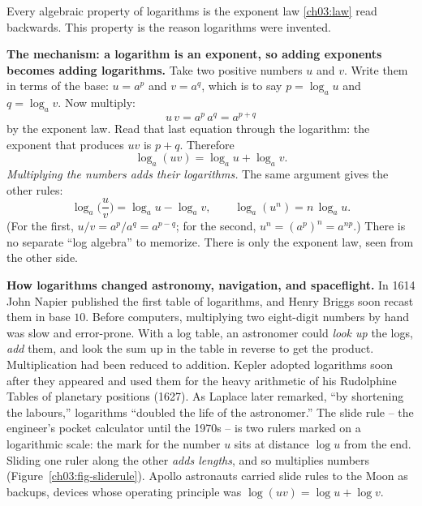 Every algebraic property of logarithms is the exponent law \eqref{ch03:law} read backwards. This property is the reason logarithms were invented.

\begin{whybox}
\textbf{The mechanism: a logarithm is an exponent, so adding exponents becomes adding logarithms.} Take two positive numbers $u$ and $v$. Write them in terms of the base: $u = a^p$ and $v = a^q$, which is to say $p=\log_a u$ and $q=\log_a v$. Now multiply:
\[
u\,v = a^p\, a^q = a^{p+q}
\]
by the exponent law. Read that last equation through the logarithm: the exponent that produces $uv$ is $p+q$. Therefore
\[
\boxed{\;\log_a(uv) = \log_a u + \log_a v.\;}
\]
\emph{Multiplying the numbers adds their logarithms.} The same argument gives the other rules:
\[
\log_a\!\Big(\frac{u}{v}\Big) = \log_a u - \log_a v, \qquad \log_a(u^n) = n\,\log_a u.
\]
(For the first, $u/v = a^p/a^q = a^{p-q}$; for the second, $u^n = (a^p)^n = a^{np}$.)
There is no separate ``log algebra'' to memorize. There is only the exponent law, seen from the other side.
\end{whybox}

\begin{applicationbox}
\textbf{How logarithms changed astronomy, navigation, and spaceflight.}
In 1614 John Napier published the first table of logarithms, and Henry Briggs soon recast them in base $10$. Before computers, multiplying two eight-digit numbers by hand was slow and error-prone. With a log table, an astronomer could \emph{look up} the logs, \emph{add} them, and look the sum up in the table in reverse to get the product. Multiplication had been reduced to addition. Kepler adopted logarithms soon after they appeared and used them for the heavy arithmetic of his Rudolphine Tables of planetary positions (1627). As Laplace later remarked, ``by shortening the labours,'' logarithms ``doubled the life of the astronomer.'' The slide rule -- the engineer's pocket calculator until the 1970s -- is two rulers marked on a logarithmic scale: the mark for the number $u$ sits at distance $\log u$ from the end. Sliding one ruler along the other \emph{adds lengths}, and so multiplies numbers (Figure~\ref{ch03:fig-sliderule}). Apollo astronauts carried slide rules to the Moon as backups, devices whose operating principle was $\log(uv)=\log u+\log v$.
\end{applicationbox}

